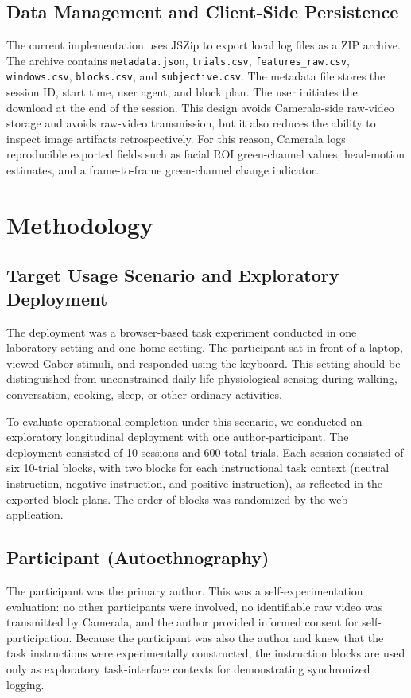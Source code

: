 \documentclass[dvipdfmx]{ehis}
\begin{document}
\subsection{Data Management and Client-Side Persistence}
The current implementation uses JSZip to export local log files as a ZIP archive.
The archive contains \texttt{metadata.json}, \texttt{trials.csv}, \texttt{features\_raw.csv}, \texttt{windows.csv}, \texttt{blocks.csv}, and \texttt{subjective.csv}.
The metadata file stores the session ID, start time, user agent, and block plan.
The user initiates the download at the end of the session.
This design avoids Camerala-side raw-video storage and avoids raw-video transmission, but it also reduces the ability to inspect image artifacts retrospectively.
For this reason, Camerala logs reproducible exported fields such as facial ROI green-channel values, head-motion estimates, and a frame-to-frame green-channel change indicator.

\section{Methodology}

\subsection{Target Usage Scenario and Exploratory Deployment}
The deployment was a browser-based task experiment conducted in one laboratory setting and one home setting.
The participant sat in front of a laptop, viewed Gabor stimuli, and responded using the keyboard.
This setting should be distinguished from unconstrained daily-life physiological sensing during walking, conversation, cooking, sleep, or other ordinary activities.

To evaluate operational completion under this scenario, we conducted an exploratory longitudinal deployment with one author-participant.
The deployment consisted of 10 sessions and 600 total trials.
Each session consisted of six 10-trial blocks, with two blocks for each instructional task context (neutral instruction, negative instruction, and positive instruction), as reflected in the exported block plans.
The order of blocks was randomized by the web application.

\subsection{Participant (Autoethnography)}
The participant was the primary author.
This was a self-experimentation evaluation: no other participants were involved, no identifiable raw video was transmitted by Camerala, and the author provided informed consent for self-participation.
Because the participant was also the author and knew that the task instructions were experimentally constructed, the instruction blocks are used only as exploratory task-interface contexts for demonstrating synchronized logging.
\end{document}
